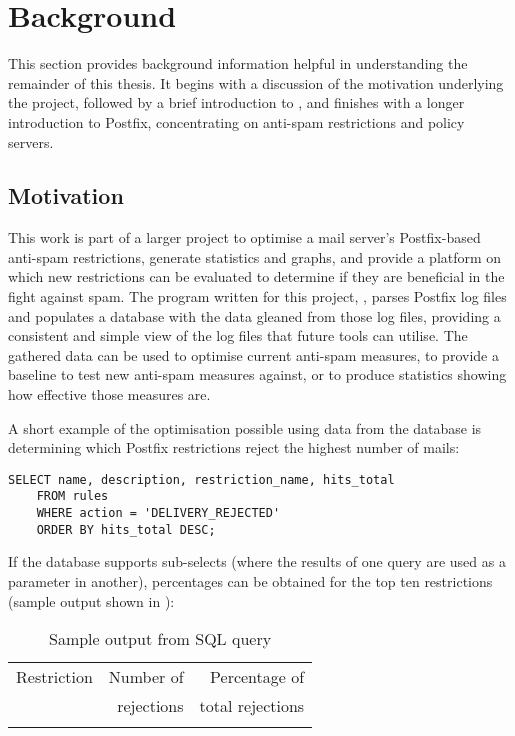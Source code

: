 \chapter{Background}

\label{background}

This section provides background information helpful in understanding the
remainder of this thesis.  It begins with a discussion of the motivation
underlying the project, followed by a brief introduction to ,
and finishes with a longer introduction to Postfix, concentrating on
anti-spam restrictions and policy servers.

\section{Motivation}

\label{motivation}

This work is part of a larger project to optimise a mail server's
Postfix-based anti-spam restrictions, generate statistics and graphs, and
provide a platform on which new restrictions can be evaluated to determine
if they are beneficial in the fight against spam.  The program written for
this project, \parsername{}, parses Postfix log files and populates a
database with the data gleaned from those log files, providing a consistent
and simple view of the log files that future tools can utilise.  The
gathered data can be used to optimise current anti-spam measures, to
provide a baseline to test new anti-spam measures against, or to produce
statistics showing how effective those measures are.

A short example of the optimisation possible using data from the database
is determining which Postfix restrictions reject the highest number of
mails:

\begin{verbatim}
SELECT name, description, restriction_name, hits_total
    FROM rules
    WHERE action = 'DELIVERY_REJECTED'
    ORDER BY hits_total DESC;
\end{verbatim}

If the database supports sub-selects (where the results of one query are
used as a parameter in another), percentages can be obtained for the top
ten restrictions (sample output shown in ):



\begin{table}[ht]
    \caption{Sample output from SQL query}
    \empty{}\label{Sample output from SQL query}
    \begin{tabular}[]{lrr}
        \tabletopline{}%
        Restriction & Number of  & Percentage of    \\
                    & rejections & total rejections \\
        \tablemiddleline{}%
        
        \tablebottomline{}%
    \end{tabular}
\end{table}


